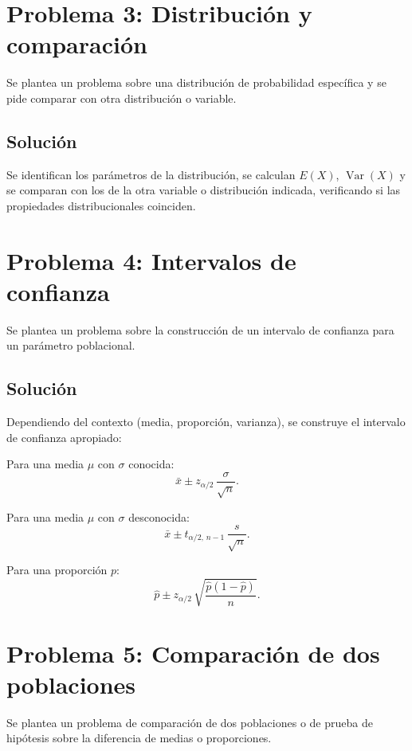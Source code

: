 \documentclass[12pt]{article}
\begin{document}
\section{Problema 3: Distribución y comparación}

Se plantea un problema sobre una distribución de probabilidad específica y se pide comparar con otra distribución o variable.

\subsection{Solución}

Se identifican los parámetros de la distribución, se calculan $E(X)$, $\operatorname{Var}(X)$ y se comparan con los de la otra variable o distribución indicada, verificando si las propiedades distribucionales coinciden.

\section{Problema 4: Intervalos de confianza}

Se plantea un problema sobre la construcción de un intervalo de confianza para un parámetro poblacional.

\subsection{Solución}

Dependiendo del contexto (media, proporción, varianza), se construye el intervalo de confianza apropiado:

Para una media $\mu$ con $\sigma$ conocida:
$$\bar{x} \pm z_{\alpha/2}\,\frac{\sigma}{\sqrt{n}}.$$

Para una media $\mu$ con $\sigma$ desconocida:
$$\bar{x} \pm t_{\alpha/2,\, n-1}\,\frac{s}{\sqrt{n}}.$$

Para una proporción $p$:
$$\hat{p} \pm z_{\alpha/2}\,\sqrt{\frac{\hat{p}(1-\hat{p})}{n}}.$$

\section{Problema 5: Comparación de dos poblaciones}

Se plantea un problema de comparación de dos poblaciones o de prueba de hipótesis sobre la diferencia de medias o proporciones.
\end{document}
